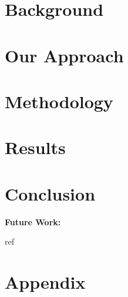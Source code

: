 \documentclass[conference]{IEEEtran}
\begin{document}
\section{Background}


\section{Our Approach}


\section{Methodology}


\section{Results}


\section{Conclusion}

\noindent
\textbf{Future Work:}

\begin{thebibliography}{00}
 ref
\end{thebibliography}

\newpage
\onecolumn
\appendix
\section{Appendix}
\end{document}
